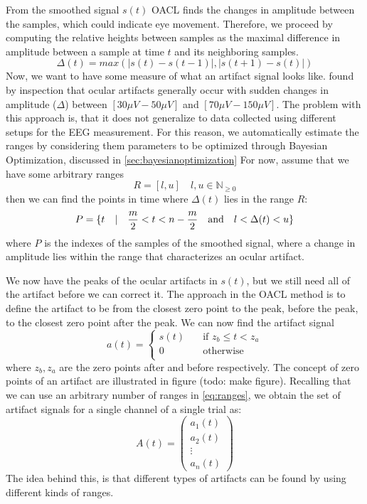 From the smoothed signal $s(t)$ OACL finds the changes in amplitude between the samples, which could indicate eye movement. Therefore, we proceed by computing the relative heights between samples as the maximal difference in amplitude between a sample at time $t$ and its neighboring samples.
\begin{equation}
\label{eq:relheights}
\Delta (t) = max(|s(t)-s(t-1)|,|s(t+1) - s(t)|)
\end{equation}
Now, we want to have some measure of what an artifact signal looks like. \citet{li2015ocular} found by inspection that ocular artifacts generally occur with sudden changes in amplitude ($\Delta$) between $[30\mu V-50\mu V]$ and $[70\mu V-150\mu V]$. The problem with this approach is, that it does not generalize to data collected using different setups for the EEG measurement. For this reason, we automatically estimate the ranges by considering them parameters to be optimized through Bayesian Optimization, discussed in \cref{sec:bayesianoptimization}
For now, assume that we have some arbitrary ranges
\begin{equation}
\label{eq:ranges}
R=[l, u] \quad  l,u \in \mathbb{N}_{\geq 0}
\end{equation}
then we can find the points in time where $\Delta (t)$  lies in the range $R$:
\begin{equation}
\label{eq:peaks}
P = \{t \quad | \quad \frac{m}{2} < t < n-\frac{m}{2} \quad \textnormal{and} \quad l < \Delta (t) < u\}
\end{equation}
where $P$ is the indexes of the samples of the smoothed signal, where a change in amplitude lies within the range that characterizes an ocular artifact.

We now have the peaks of the ocular artifacts in $s(t)$, but we still need all of the artifact before we can correct it. The approach in the OACL method is to define the artifact to be from the closest zero point to the peak, before the peak, to the closest zero point after the peak. We can now find the artifact signal 
\begin{equation}
\label{eq:artifactsignal}
a(t) =
\begin{cases}
s(t)      & \quad \text{if } z_b \leq t < z_a\\
0  & \quad \text{otherwise}\\
\end{cases}
\end{equation}
where $z_b, z_a$ are the zero points after and before respectively. The concept of zero points of an artifact are illustrated in figure (todo: make figure).
Recalling that we can use an arbitrary number of ranges in \ref{eq:ranges}, we obtain the set of artifact signals for a single channel of a single trial as:
\begin{equation}
A(t)=  \begin{pmatrix}
a_1(t) \\
a_2(t) \\
\vdots  \\
a_n(t) 
\end{pmatrix}
\end{equation}
The idea behind this, is that different types of artifacts can be found by using different kinds of ranges. 
